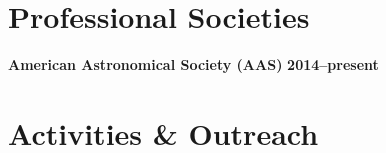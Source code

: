 \documentclass[margin]{res}
\begin{document}
\begin{resume}
\section{Professional Societies}

{\bf American Astronomical Society (AAS)}  \hfill {\bf 2014--present}\\









\section{Activities \& Outreach} %



\end{resume}
\end{document}
